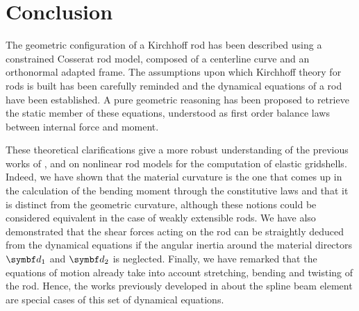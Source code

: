 

\pagebreak
\section{Conclusion}
The geometric configuration of a Kirchhoff rod has been described using a constrained Cosserat rod model, composed of a centerline curve and an orthonormal adapted frame. The assumptions upon which Kirchhoff theory for rods is built has been carefully reminded and the dynamical equations of a rod have been established. A pure geometric reasoning has been proposed to retrieve the static member of these equations, understood as first order balance laws between internal force and moment.

These theoretical clarifications give a more robust understanding of the previous works of ,  and  on nonlinear rod models for the computation of elastic gridshells. Indeed, we have shown that the material curvature is the one that comes up in the calculation of the bending moment through the constitutive laws and that it is distinct from the geometric curvature, although these notions could be considered equivalent in the case of weakly extensible rods. We have also demonstrated that the shear forces acting on the rod can be straightly deduced from the dynamical equations if the angular inertia around the material directors $\vect{d}_1$ and $\vect{d}_2$ is neglected. Finally, we have remarked that the equations of motion already take into account stretching, bending and twisting of the rod. Hence, the works previously developed in \cite{Adriaenssens1999,Douthe2007} about the  spline beam element are special cases of this set of dynamical equations.

